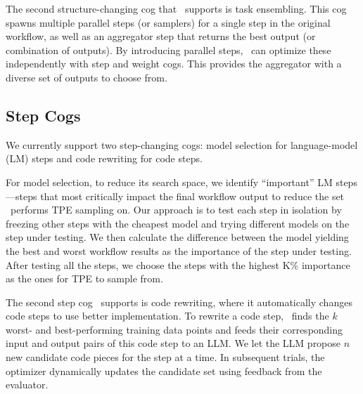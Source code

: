 


The second structure-changing cog that \sysname\ supports is task ensembling. This cog spawns multiple parallel steps (or samplers) for a single step in the original workflow, as well as an aggregator step that returns the best output (or combination of outputs). By introducing parallel steps, \sysname\ can optimize these independently with step and weight cogs. This provides the aggregator with a diverse set of outputs to choose from. 


\subsection{Step Cogs}
We currently support two step-changing cogs: model selection for language-model (LM) steps and code rewriting for code steps.

For model selection, to reduce its search space, we identify ``important'' LM steps---steps that most critically impact the final workflow output to reduce the set \search\ performs TPE sampling on. Our approach is to test each step in isolation by freezing other steps with the cheapest model and trying different models on the step under testing. 
We then calculate the difference between the model yielding the best and worst workflow results as the importance of the step under testing. %
After testing all the steps, we choose the steps with the highest K\% importance as the ones for TPE to sample from.

The second step cog \sysname\ supports is code rewriting, where it automatically changes code steps to use better implementation. To rewrite a code step, \sysname\ finds the $k$ worst- and best-performing training data points and feeds their corresponding input and output pairs of this code step to an LLM. We let the LLM propose $n$ new candidate code pieces for the step at a time.
In subsequent trials, the optimizer dynamically updates the candidate set using feedback from the evaluator.


